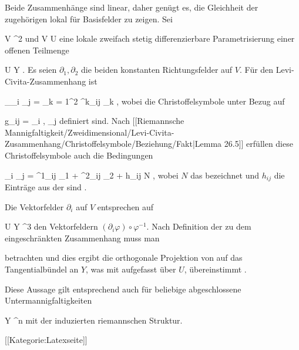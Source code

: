 {

Beide Zusammenhänge sind linear, daher genügt es, die Gleichheit der zugehörigen
lokal für Basisfelder zu zeigen. Sei

\mavergleichskette
{\vergleichskette
{ V
}
{ \subseteq }{ \R^2
}
{  }{
}
{    }{
}
{   }{
}
}
{}{}{}
und
\maabbdisp {\varphi} { V } { U
} {}
eine lokale zweifach stetig differenzierbare Parametrisierung einer offenen Teilmenge

\mavergleichskette
{\vergleichskette
{ U
}
{ \subseteq }{ Y
}
{  }{
}
{    }{
}
{   }{
}
}
{}{}{.}
Es seien $\partial_1,\partial_2$ die beiden konstanten Richtungsfelder auf $V$. Für den
Levi-Civita-Zusammenhang ist

\mavergleichskettedisp
{\vergleichskette
{ \nabla_{\partial_i } \partial_j
}
{ =} { \sum_{k = 1}^2  \Gamma^k_{ij} \partial_k
}
{ } {
}
{ } {
}
{ } {
}
}
{}{}{,}
wobei die Christoffelsymbole unter Bezug auf

\mavergleichskettedisp
{\vergleichskette
{ g_{ij}
}
{ =} { \left\langle  \partial_i \varphi ,  \partial_j \varphi  \right\rangle
}
{ } {
}
{ } {
}
{ } {
}
}
{}{}{}
definiert sind. Nach
[[Riemannsche Mannigfaltigkeit/Zweidimensional/Levi-Civita-Zusammenhang/Christoffelsymbole/Beziehung/Fakt|Lemma 26.5]]
erfüllen diese Christoffelsymbole auch die Bedingungen

\mavergleichskettedisp
{\vergleichskette
{ \partial_i \partial_j \varphi
}
{ =} { \Gamma^1_{ij} \partial_1  \varphi +  \Gamma^2_{ij}  \partial_2  \varphi+   h_{ij} N
}
{ } {
}
{ } {
}
{ } {
}
}
{}{}{,}
wobei $N$ das
bezeichnet und $h_{ij}$ die Einträge aus der
sind
 {} {.}

Die Vektorfelder $\partial_i$ auf $V$ entsprechen auf

\mavergleichskette
{\vergleichskette
{ U
}
{ \subseteq }{ Y
}
{ \subseteq }{ \R^3
}
{    }{
}
{   }{
}
}
{}{}{}
den Vektorfeldern $\left(  \partial_i \varphi  \right)  \circ \varphi^{-1}$. Nach Definition der
zu dem eingeschränkten Zusammenhang muss man

 {  }

betrachten und dies ergibt die orthogonale Projektion von
 auf das Tangentialbündel an  $Y$, was mit
 aufgefasst über $U$,  übereinstimmt
 {} {.}

}

Diese Aussage gilt entsprechend auch für beliebige abgeschlossene Untermannigfaltigkeiten

\mavergleichskette
{\vergleichskette
{ Y
}
{ \subseteq }{ \R^n
}
{  }{
}
{    }{
}
{   }{
}
}
{}{}{}
mit der induzierten riemannschen Struktur.

 [[Kategorie:Latexseite]]
